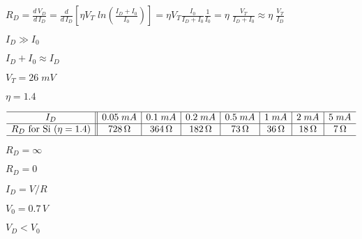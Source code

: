 \documentclass{article}
\def\lthtmlcheckvsize{\ifdim\ht\sizebox<\vsize 
  \ifdim\wd\sizebox<\hsize\expandafter\hfill\fi \expandafter\vfill
  \else\expandafter\vss\fi}%
\begin{document}
{\newpage\clearpage
{}%
$\displaystyle R_D=\frac{d\,V_D}{d\,I_D}=\frac{d}{d\,I_D} \left[\eta V_T\;ln \left(\frac{I_D+I_0}{I_0}\right) \right]
=\eta V_T \frac{I_0}{I_D+I_0}\frac{1}{I_0}=\eta \; \frac{V_T}{I_D+I_0}
\approx \eta \; \frac{V_T}{I_D}$%
\lthtmlindisplaymathZ
\lthtmlcheckvsize\clearpage}

{\newpage\clearpage
{}%
$ I_D \gg I_0$%
\lthtmlindisplaymathZ
\lthtmlcheckvsize\clearpage}

{\newpage\clearpage
{}%
$ I_D+I_0\approx I_D$%
\lthtmlindisplaymathZ
\lthtmlcheckvsize\clearpage}

{\newpage\clearpage
{}%
$ V_T=26\;mV$%
\lthtmlindisplaymathZ
\lthtmlcheckvsize\clearpage}

{\newpage\clearpage
{}%
$ \eta=1.4$%
\lthtmlindisplaymathZ
\lthtmlcheckvsize\clearpage}

{\newpage\clearpage
{}%
\begin{displaymath}\begin{array}{c||c|c|c|c|c|c|c} \hline
I_D	& 0.05\; mA & 0.1\; mA & 0.2 \;mA & 0.5\; mA & 1\; mA & 2\; mA & 5\; mA \\\hline
R_D \mbox{ for Si } (\eta=1.4) & 728\,\Omega & 364\,\Omega & 182\,\Omega &
73\,\Omega & 36\,\Omega & 18\,\Omega & 7\,\Omega\\\hline
\end{array}\end{displaymath}%
\lthtmldisplayZ
\lthtmlcheckvsize\clearpage}

{\newpage\clearpage
{}%
$ R_D=\infty$%
\lthtmlindisplaymathZ
\lthtmlcheckvsize\clearpage}

{\newpage\clearpage
{}%
$ R_D=0$%
\lthtmlindisplaymathZ
\lthtmlcheckvsize\clearpage}

{\newpage\clearpage
{}%
$ I_D=V/R$%
\lthtmlindisplaymathZ
\lthtmlcheckvsize\clearpage}

{\newpage\clearpage
{}%
$ V_0=0.7\,V$%
\lthtmlindisplaymathZ
\lthtmlcheckvsize\clearpage}

{\newpage\clearpage
{}%
$ V_D<V_0$%
\lthtmlindisplaymathZ
\lthtmlcheckvsize\clearpage}
\end{document}

